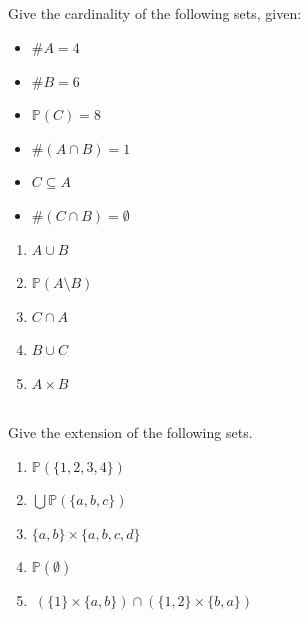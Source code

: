 \documentclass[twocolumn]{article}
\begin{document}
\subsection{}

    Give the cardinality of the following sets, given:

\begin{multicols}{2}
    \begin{itemize}
        \item $\#A = 4$
        \item $\#B = 6$
        \item $\mathbb{P}(C) = 8$
        \item $\#(A \cap B) = 1$
        \item $ C \subseteq A $
        \item $ \# (C \cap B) = \emptyset$
    \end{itemize}
\end{multicols}

    \begin{enumerate}
        \item $ A \cup B $
        \item $ \mathbb{P}(A \setminus B)$
        \item $ C \cap A $
        \item $ B \cup C $
        \item $ A \times B $
    \end{enumerate}

    \subsection{}

    Give the extension of the following sets.

    \begin{enumerate}
        \item $\mathbb{P}(\{ 1, 2, 3, 4 \})$
        \item $ \bigcup  \mathbb{P}(\{a, b, c\})  $
        \item $ \{a, b\} \times \{ a, b, c, d \} $
        \item $ \mathbb{P} ( \emptyset ) $
        \item $ \ ( \{ 1 \} \times \{ a, b \} ) \cap ( \{ 1, 2 \} \times \{ b, a \} ) $
    \end{enumerate}


\subsection{}
\end{document}
